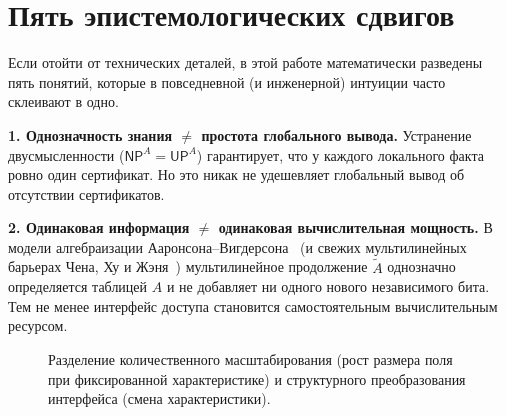 \documentclass[11pt,a4paper]{article}
\newcommand{\Pcl}{\mathsf{P}}
\newcommand{\NP}{\mathsf{NP}}
\newcommand{\UP}{\mathsf{UP}}
\newcommand{\F}{\mathbb{F}}
\begin{document}
\section{Пять эпистемологических сдвигов}

Если отойти от технических деталей, в этой работе математически разведены пять понятий, которые в повседневной (и инженерной) интуиции часто склеивают в одно.

\textbf{1. Однозначность знания $\ne$ простота глобального вывода.} Устранение двусмысленности ($\NP^A = \UP^A$) гарантирует, что у каждого локального факта ровно один сертификат. Но это никак не удешевляет глобальный вывод об отсутствии сертификатов.

\textbf{2. Одинаковая информация $\ne$ одинаковая вычислительная мощность.} В модели алгебраизации Ааронсона--Вигдерсона~\cite{AaronsonWigderson2009} (и свежих мультилинейных барьерах Чена, Ху и Жэня~\cite{ChenHuRen2026}) мультилинейное продолжение $\widetilde{A}$ однозначно определяется таблицей $A$ и не добавляет ни одного нового независимого бита. Тем не менее интерфейс доступа становится самостоятельным вычислительным ресурсом.

\begin{figure}[!htbp]
\centering
{}
\caption{Разделение количественного масштабирования (рост размера поля при фиксированной характеристике) и структурного преобразования интерфейса (смена характеристики).}
\end{figure}
\end{document}
